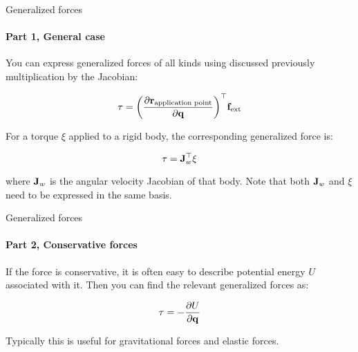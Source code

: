 \documentclass{beamer}
\begin{document}
\begin{frame}{Generalized forces}
\framesubtitle{Part 1, General case}
\begin{flushleft}

You can express generalized forces of all kinds using discussed previously multiplication by the Jacobian:

\begin{equation}
    \tau = \bigg( \frac{\partial \mathbf{r}_{\text{application point}} }{\partial \mathbf{q}} \bigg) ^\top \mathbf{f}_{\text{ext}}
\end{equation}

For a torque $\xi$ applied to a rigid body, the corresponding generalized force is:

\begin{equation}
    \tau = \mathbf{J}_w^\top \xi
\end{equation}

where $\mathbf{J}_w$ is the angular velocity Jacobian of that body. Note that both $\mathbf{J}_w$ and $\xi$ need to be expressed in the same basis.

     
\end{flushleft}
\end{frame}



\begin{frame}{Generalized forces}
\framesubtitle{Part 2, Conservative forces}
\begin{flushleft}

If the force is conservative, it is often easy to describe potential energy $U$ associated with it. Then you can find the relevant generalized forces as:

\begin{equation}
    \tau = -\frac{\partial U }{\partial \mathbf{q}}
\end{equation}

Typically this is useful for gravitational forces and elastic forces.

\end{flushleft}
\end{frame}
\end{document}
